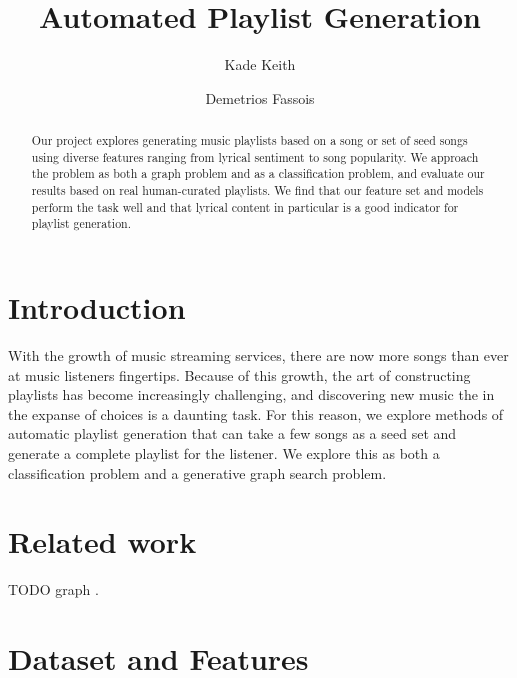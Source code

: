 \documentclass[acmtog]{acmart}
\begin{document}
\title{Automated Playlist Generation}

\author{Kade Keith}
\author{Demetrios Fassois}

\begin{abstract}
Our project explores generating music playlists based on a song or set of seed songs using diverse features ranging from lyrical sentiment to song popularity. We approach the problem as both a graph problem and as a classification problem, and evaluate our results based on real human-curated playlists. We find that our feature set and models perform the task well and that lyrical content in particular is a good indicator for playlist generation.
\end{abstract}

\maketitle
\thispagestyle{empty}

\section{Introduction}

With the growth of music streaming services, there are now more songs than ever at music listeners fingertips. Because of this growth, the art of constructing playlists has become increasingly challenging, and discovering new music the in the expanse of choices is a daunting task. For this reason, we explore methods of automatic playlist generation that can take a few songs as a seed set and generate a complete playlist for the listener. We explore this as both a classification problem and a generative graph search problem.

\section{Related work}

TODO graph \cite{Alghoniemy01anetwork}.

\section{Dataset and Features}
\end{document}
